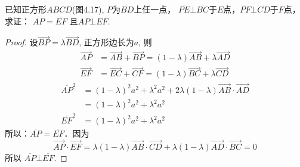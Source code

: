 \begin{example}
    已知正方形$ABCD$(图4.17), $P$为$\overline{BD}$上任一点，
$\overline{PE}\bot \overline{BC}$于$E$点，$\overline{PF}\bot \overline{CD}$于$F$点，求证：
$\overline{AP}=\overline{EF}$
且$AP\bot EF$.
\end{example}

\begin{proof}
设$\Vec{BP}=\lambda \Vec{BD}$, 正方形边长为$a$, 则
\[\begin{split}
    \Vec{AP}&=\Vec{AB}+\Vec{BP}=(1-\lambda)\Vec{AB}+\lambda\Vec{AD}\\
    \Vec{EF}&=\Vec{EC}+\Vec{CF}=(1-\lambda)\Vec{BC}+\lambda\Vec{CD}
\end{split}\]
\[\begin{split}
    \overline{AP}^2&=(1-\lambda )^2 a^2+\lambda^2 a^2+2\lambda(1-\lambda)\Vec{AB}\cdot \Vec{AD}\\
&=(1-\lambda )^2 a^2+\lambda^2 a^2\\
\overline{EF}^2&=(1-\lambda )^2 a^2+\lambda^2 a^2
\end{split}\]
所以：$\overline{AP}=\overline{EF}$．因为
\[\Vec{AP}\cdot \Vec{EF}=\lambda (1-\lambda)\Vec{AB}\cdot \Vec{CD}+\lambda(1-\lambda)\Vec{AD}\cdot \Vec{BC}=0\]
所以
$\overline{AP} \bot \overline{EF}$.
\end{proof}

\begin{figure}[htp]\centering
    \begin{minipage}[t]{0.48\textwidth}
    \centering
{}
    \caption{}
    \end{minipage}
    \begin{minipage}[t]{0.48\textwidth}
    \centering
    \caption{}
    \end{minipage}
    \end{figure}

